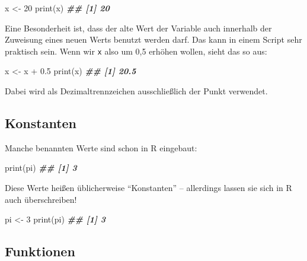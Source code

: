 \documentclass[11pt,german,a4paper]{article}
\newenvironment{Shaded}{\begin{snugshade}}{\end{snugshade}}
\newcommand{\DecValTok}[1]{\textcolor[rgb]{0.00,0.00,0.81}{#1}}
\newcommand{\DocumentationTok}[1]{\textcolor[rgb]{0.56,0.35,0.01}{\textbf{\textit{#1}}}}
\newcommand{\FloatTok}[1]{\textcolor[rgb]{0.00,0.00,0.81}{#1}}
\newcommand{\FunctionTok}[1]{\textcolor[rgb]{0.00,0.00,0.00}{#1}}
\newcommand{\NormalTok}[1]{#1}
\newcommand{\OtherTok}[1]{\textcolor[rgb]{0.56,0.35,0.01}{#1}}
\newcommand{\SpecialCharTok}[1]{\textcolor[rgb]{0.00,0.00,0.00}{#1}}
\begin{document}
\begin{Shaded}
\begin{Highlighting}[]
\NormalTok{x }\OtherTok{\textless{}{-}} \DecValTok{20}
\FunctionTok{print}\NormalTok{(x)}
\DocumentationTok{\#\# [1] 20}
\end{Highlighting}
\end{Shaded}

Eine Besonderheit ist, dass der alte Wert der Variable auch innerhalb der Zuweisung eines neuen Werts benutzt werden darf. Das kann in einem Script sehr praktisch sein. Wenn wir \texttt{x} also um 0,5 erhöhen wollen, sieht das so aus:

\begin{Shaded}
\begin{Highlighting}[]
\NormalTok{x }\OtherTok{\textless{}{-}}\NormalTok{ x }\SpecialCharTok{+} \FloatTok{0.5}
\FunctionTok{print}\NormalTok{(x)}
\DocumentationTok{\#\# [1] 20.5}
\end{Highlighting}
\end{Shaded}

Dabei wird als Dezimaltrennzeichen ausschließlich der Punkt verwendet.

\hypertarget{konstanten}{%
\subsection{Konstanten}\label{konstanten}}

Manche benannten Werte sind schon in R eingebaut:

\begin{Shaded}
\begin{Highlighting}[]
\FunctionTok{print}\NormalTok{(pi)}
\DocumentationTok{\#\# [1] 3}
\end{Highlighting}
\end{Shaded}

Diese Werte heißen üblicherweise ``Konstanten'' -- allerdings lassen sie sich in R auch überschreiben!

\begin{Shaded}
\begin{Highlighting}[]
\NormalTok{pi }\OtherTok{\textless{}{-}} \DecValTok{3}
\FunctionTok{print}\NormalTok{(pi)}
\DocumentationTok{\#\# [1] 3}
\end{Highlighting}
\end{Shaded}

\hypertarget{funktionen}{%
\subsection{Funktionen}\label{funktionen}}
\end{document}
